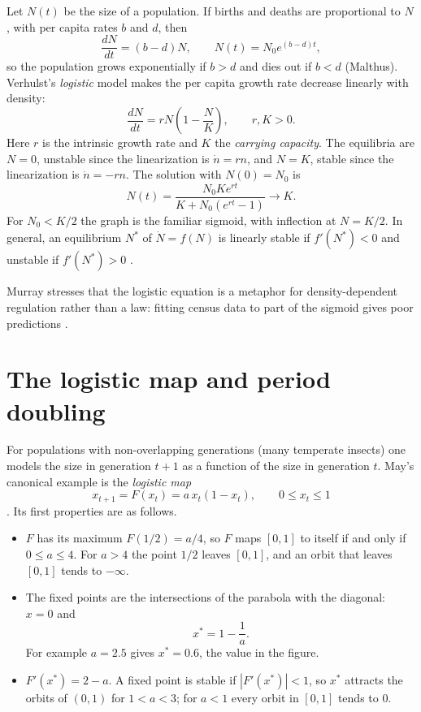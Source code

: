 Let $N(t)$ be the size of a population. If
births and deaths are proportional to $N$,
with per capita rates $b$ and $d$, then
$$
\frac{dN}{dt} = (b-d)N,
\qquad
N(t) = N_0 e^{(b-d)t},
$$
so the population grows exponentially if
$b>d$ and dies out if $b<d$ (Malthus).
Verhulst's \emph{logistic} model makes the
per capita growth rate decrease linearly
with density:
\begin{equation}
\label{equation-logistic}
\frac{dN}{dt} = rN\left(1-\frac{N}{K}\right),
\qquad r, K > 0.
\end{equation}
Here $r$ is the intrinsic growth rate and
$K$ the \emph{carrying capacity}. The
equilibria are $N=0$, unstable since the
linearization is $\dot n = rn$, and $N=K$,
stable since the linearization is
$\dot n = -rn$. The solution with
$N(0)=N_0$ is
$$
N(t) =
\frac{N_0 K e^{rt}}{K + N_0(e^{rt}-1)}
\longrightarrow K .
$$
For $N_0<K/2$ the graph is the familiar
sigmoid, with inflection at $N=K/2$. In
general, an equilibrium $N^*$ of
$\dot N = f(N)$ is linearly stable if
$f'(N^*)<0$ and unstable if $f'(N^*)>0$
\cite[Section 1.1]{murray2002mathematical}.

\begin{remark}
\label{remark-logistic-metaphor}
Murray stresses that the logistic equation
is a metaphor for density-dependent
regulation rather than a law: fitting
census data to part of the sigmoid gives
poor predictions
\cite[Section 1.1]{murray2002mathematical}.
\end{remark}

\section{The logistic map and period
doubling}
\label{section-logistic-map}

For populations with non-overlapping
generations (many temperate insects) one
models the size in generation $t+1$ as a
function of the size in generation $t$.
May's canonical example is the
\emph{logistic map}
\begin{equation}
\label{equation-logistic-map}
x_{t+1} = F(x_t) = a\, x_t(1-x_t),
\qquad 0 \le x_t \le 1
\end{equation}
\cite{may1976simple}. Its first properties
are as follows.

\begin{itemize}
\item $F$ has its maximum $F(1/2)=a/4$, so
$F$ maps $[0,1]$ to itself if and only if
$0\le a\le 4$. For $a>4$ the point $1/2$
leaves $[0,1]$, and an orbit that leaves
$[0,1]$ tends to $-\infty$.
\item The fixed points are the intersections
of the parabola with the diagonal:
$x=0$ and
$$
x^* = 1 - \frac{1}{a}.
$$
For example $a=2.5$ gives $x^*=0.6$, the
value in the figure.
\item $F'(x^*) = 2-a$. A fixed point is
stable if $|F'(x^*)|<1$, so $x^*$ attracts
the orbits of $(0,1)$ for $1<a<3$; for
$a<1$ every orbit in $[0,1]$ tends to $0$.
\end{itemize}

